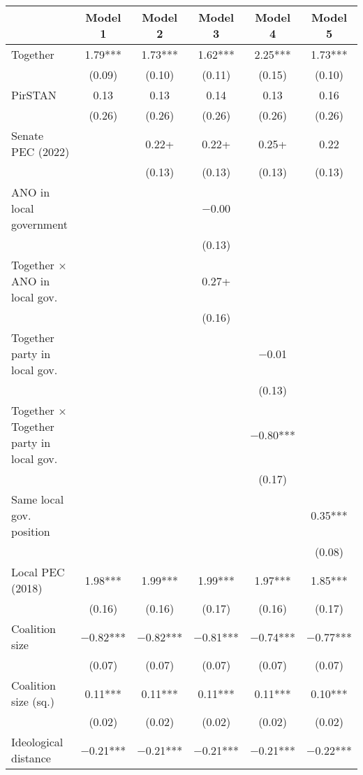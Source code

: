 \begin{table}
\centering
\begin{tabular}[t]{lccccc}
\toprule
  & Model 1 & Model 2 & Model 3 & Model 4 & Model 5\\
\midrule
Together & \num{1.79}*** & \num{1.73}*** & \num{1.62}*** & \num{2.25}*** & \num{1.73}***\\
 & (\num{0.09}) & (\num{0.10}) & (\num{0.11}) & (\num{0.15}) & (\num{0.10})\\
PirSTAN & \num{0.13} & \num{0.13} & \num{0.14} & \num{0.13} & \num{0.16}\\
 & (\num{0.26}) & (\num{0.26}) & (\num{0.26}) & (\num{0.26}) & (\num{0.26})\\
Senate PEC (2022) &  & \num{0.22}+ & \num{0.22}+ & \num{0.25}+ & \num{0.22}\\
 &  & (\num{0.13}) & (\num{0.13}) & (\num{0.13}) & (\num{0.13})\\
ANO in local government &  &  & \num{-0.00} &  & \\
 &  &  & (\num{0.13}) &  & \\
Together × ANO in local gov. &  &  & \num{0.27}+ &  & \\
 &  &  & (\num{0.16}) &  & \\
Together party in local gov. &  &  &  & \num{-0.01} & \\
 &  &  &  & (\num{0.13}) & \\
Together × Together party in local gov. &  &  &  & \num{-0.80}*** & \\
 &  &  &  & (\num{0.17}) & \\
Same local gov. position &  &  &  &  & \num{0.35}***\\
 &  &  &  &  & (\num{0.08})\\
Local PEC (2018) & \num{1.98}*** & \num{1.99}*** & \num{1.99}*** & \num{1.97}*** & \num{1.85}***\\
 & (\num{0.16}) & (\num{0.16}) & (\num{0.17}) & (\num{0.16}) & (\num{0.17})\\
Coalition size & \num{-0.82}*** & \num{-0.82}*** & \num{-0.81}*** & \num{-0.74}*** & \num{-0.77}***\\
 & (\num{0.07}) & (\num{0.07}) & (\num{0.07}) & (\num{0.07}) & (\num{0.07})\\
Coalition size (sq.) & \num{0.11}*** & \num{0.11}*** & \num{0.11}*** & \num{0.11}*** & \num{0.10}***\\
 & (\num{0.02}) & (\num{0.02}) & (\num{0.02}) & (\num{0.02}) & (\num{0.02})\\
Ideological distance & \num{-0.21}*** & \num{-0.21}*** & \num{-0.21}*** & \num{-0.21}*** & \num{-0.22}***\\

\end{tabular}
\end{table}
